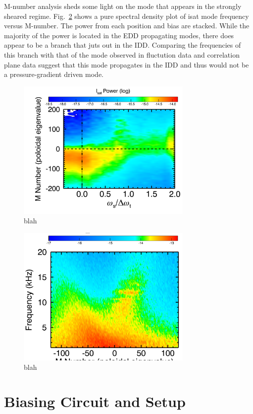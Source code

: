 \documentclass[aip,pop,amsmath,amssymb,preprint,superscriptaddress]{revtex4-1} %
\begin{document}
M-number analysis sheds some light on the mode that appears in the strongly sheared regime. Fig.~\ref{fig:m_spec_vs_freq} shows a pure spectral density plot of isat mode frequency versus M-number. The power from each position and bias are stacked. While the majority of the power is located in the EDD propagating modes, there does appear to be a branch that juts out in the IDD. Comparing the frequencies of this branch with that of the mode observed in fluctution data and correlation plane data suggest that this mode propagates in the IDD and thus would not be a pressure-gradient driven mode.

\begin{figure}[!htbp]
\centerline{
\includegraphics[width=8.5cm]{m_spec_vs_bias}}
\caption{\label{fig:m_spec_vs_bias} blah}
\end{figure}

\begin{figure}[!htbp]
\centerline{
\includegraphics[width=8.5cm]{m_spec_vs_freq}}
\caption{\label{fig:m_spec_vs_freq} blah}
\end{figure}



\section{Biasing Circuit and Setup}
\end{document}

